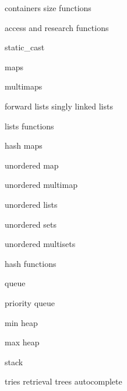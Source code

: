          containers size functions 
        
         access and research functions 
        
         static_cast 
        
         maps
        
         multimaps
        
         forward lists singly linked lists
        
         lists functions 
         
         hash maps 
        
         unordered map 
         
         unordered multimap 
        
         unordered lists 
        
         unordered sets
        
         unordered multisets
        
         hash functions
        
         queue 
        
         priority queue 

         min heap 
        
         max heap
        
         stack
        
         tries retrieval trees autocomplete 
        
